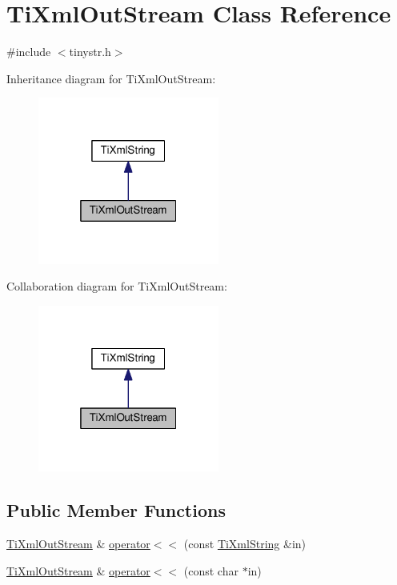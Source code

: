 \hypertarget{class_ti_xml_out_stream}{}\section{Ti\+Xml\+Out\+Stream Class Reference}
\label{class_ti_xml_out_stream}


{\ttfamily \#include $<$tinystr.\+h$>$}



Inheritance diagram for Ti\+Xml\+Out\+Stream\+:
\nopagebreak
\begin{figure}[H]
\begin{center}
\leavevmode
\includegraphics[width=169pt]{class_ti_xml_out_stream__inherit__graph}
\end{center}
\end{figure}


Collaboration diagram for Ti\+Xml\+Out\+Stream\+:
\nopagebreak
\begin{figure}[H]
\begin{center}
\leavevmode
\includegraphics[width=169pt]{class_ti_xml_out_stream__coll__graph}
\end{center}
\end{figure}
\subsection*{Public Member Functions}
\begin{DoxyCompactItemize}
\item 
\hyperlink{class_ti_xml_out_stream}{Ti\+Xml\+Out\+Stream} \& \hyperlink{class_ti_xml_out_stream_a3640dcb1c0903be3bc6966cdc9a79db6}{operator$<$$<$} (const \hyperlink{class_ti_xml_string}{Ti\+Xml\+String} \&in)
\item 
\hyperlink{class_ti_xml_out_stream}{Ti\+Xml\+Out\+Stream} \& \hyperlink{class_ti_xml_out_stream_af2117e5a8cbfcb69544804ad2859bfb6}{operator$<$$<$} (const char $\ast$in)
\end{DoxyCompactItemize}
